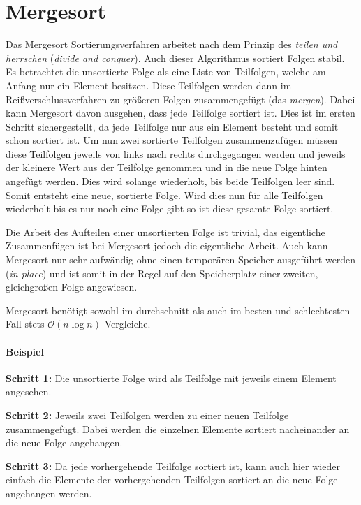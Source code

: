 \documentclass[12pt, a4paper, titlepage, hidelinks]{scrreprt}
\begin{document}
\clearpage

\section{Mergesort}
Das Mergesort Sortierungsverfahren arbeitet nach dem Prinzip des \textit{teilen und herrschen} (\textit{divide and conquer}). Auch dieser Algorithmus sortiert Folgen stabil. Es betrachtet die unsortierte Folge als eine Liste von Teilfolgen, welche am Anfang nur ein Element besitzen. Diese Teilfolgen werden dann im Reißverschlussverfahren zu größeren Folgen zusammengefügt (das \textit{mergen}). Dabei kann Mergesort davon ausgehen, dass jede Teilfolge sortiert ist. Dies ist im ersten Schritt sichergestellt, da jede Teilfolge nur aus ein Element besteht und somit schon sortiert ist. Um nun zwei sortierte Teilfolgen zusammenzufügen müssen diese Teilfolgen jeweils von links nach rechts durchgegangen werden und jeweils der kleinere Wert aus der Teilfolge genommen und in die neue Folge hinten angefügt werden. Dies wird solange wiederholt, bis beide Teilfolgen leer sind. Somit entsteht eine neue, sortierte Folge. Wird dies nun für alle Teilfolgen wiederholt bis es nur noch eine Folge gibt so ist diese gesamte Folge sortiert.

Die Arbeit des Aufteilen einer unsortierten Folge ist trivial, das eigentliche Zusammenfügen ist bei Mergesort jedoch die eigentliche Arbeit. Auch kann Mergesort nur sehr aufwändig ohne einen temporären Speicher ausgeführt werden (\textit{in-place}) und ist somit in der Regel auf den Speicherplatz einer zweiten, gleichgroßen Folge angewiesen.

Mergesort benötigt sowohl im durchschnitt als auch im besten und schlechtesten Fall stets $\mathcal{O}(n\log{}n)$ Vergleiche.

\paragraph{Beispiel}
\textbf{Schritt 1:} Die unsortierte Folge wird als Teilfolge mit jeweils einem Element angesehen.

\textbf{Schritt 2:} Jeweils zwei Teilfolgen werden zu einer neuen Teilfolge zusammengefügt. Dabei werden die einzelnen Elemente sortiert nacheinander an die neue Folge angehangen.

\textbf{Schritt 3:} Da jede vorhergehende Teilfolge sortiert ist, kann auch hier wieder einfach die Elemente der vorhergehenden Teilfolgen sortiert an die neue Folge angehangen werden.
\end{document}
